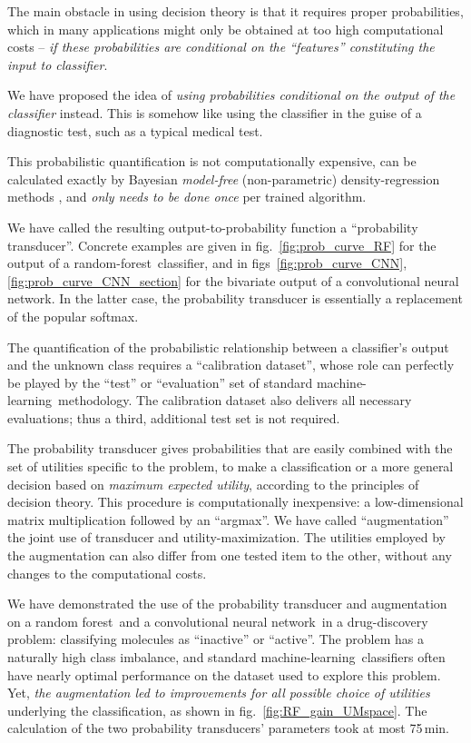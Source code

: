 \documentclass[a4paper,12pt,%
onecolumn,oneside,article,%
british%
]{memoir}
\renewcommand*{\|}[1][]{\nonscript\:#1\vert\nonscript\:\mathopen{}}
\newcommand*{\fig}{fig.}%
\newcommand*{\figs}{figs}%
\newcommand*{\ml}{machine-learning}
\newcommand*{\RF}{random forest}
\newcommand*{\rf}{random-forest}
\newcommand*{\CNN}{convolutional neural network}
\begin{document}
\medskip

The main obstacle in using decision theory is that it requires proper probabilities, which in many applications might only be obtained at too high computational costs -- \emph{if these probabilities are conditional on the \enquote{features} constituting the input to classifier}.

We have proposed the idea of \emph{using probabilities conditional on the output of the classifier} instead. This is somehow like using the classifier in the guise of a diagnostic test, such as a typical medical test.

This probabilistic quantification is not computationally expensive, can be calculated exactly by Bayesian \emph{model-free} (non-parametric) density-regression methods \autocites{dunsonetal2011}, and \emph{only needs to be done once} per trained algorithm.

We have called the resulting output-to-probability function a \enquote{probability transducer}. Concrete examples are given in \fig~\ref{fig:prob_curve_RF} for the output of a \rf\ classifier, and in \figs~\ref{fig:prob_curve_CNN}, \ref{fig:prob_curve_CNN_section} for the bivariate output of a \CNN. In the latter case, the probability transducer is essentially a replacement of the popular softmax.

The quantification of the probabilistic relationship between a classifier's output and the unknown class requires a \enquote{calibration dataset}, whose role can perfectly be played by the \enquote{test} or \enquote{evaluation} set of standard \ml\ methodology. The calibration dataset also delivers all necessary evaluations; thus a third, additional test set is not required.

The probability transducer gives probabilities that are easily combined with the set of utilities specific to the problem, to make a classification or a more general decision based on \emph{maximum expected utility}, according to the principles of decision theory. This procedure is computationally inexpensive: a low-dimensional matrix multiplication followed by an \enquote{argmax}. We have called \enquote{augmentation} the joint use of transducer and utility-maximization. The utilities employed by the augmentation can also differ from one tested item to the other, without any changes to the computational costs.

We have demonstrated the use of the probability transducer and augmentation on a \RF\ and a \CNN\ in a drug-discovery problem: classifying molecules as \enquote{inactive} or \enquote{active}. The problem has a naturally high class imbalance, and standard \ml\ classifiers often have nearly optimal performance on the dataset used to explore this problem. Yet, \emph{the augmentation led to improvements for all possible choice of utilities} underlying the classification, as shown in \fig~\ref{fig:RF_gain_UMspace}. The calculation of the two probability transducers' parameters took at most 75\,min.
\end{document}
